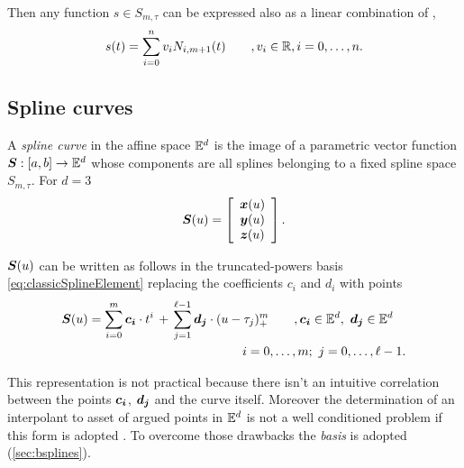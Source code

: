 \documentclass[dissertation.tex]{subfiles}
\begin{document}
Then any function $s\in S_{m,\tau}$ can be expressed also as a linear
combination of \bss,
\begin{equation}\label{eq:bsplineElement}
  s(t)=\sum_{i=0}^nv_i N_{i,m+1}(t)\qquad, v_i\in\mathbb{R}, i=0,\dots,n.
\end{equation}

\subsection{Spline curves}
A \emph{spline curve} in the affine space $\mathbb{E}^d$ is the image of a
parametric vector function $\boldsymbol{S}:[a,b]\rightarrow\mathbb{E}^d$ whose
components are all splines belonging to a fixed spline space
$S_{m,\tau}$. For $d=3$
\begin{equation}\label{eq:bsplineCurveComp}
  \boldsymbol{S}(u) = \left[
    \begin{array}{c}
      \boldsymbol{x}(u)\\
      \boldsymbol{y}(u)\\
      \boldsymbol{z}(u)
    \end{array}
    \right].
\end{equation}

$\boldsymbol{S}(u)$ can be written as follows in the
truncated-powers basis
\cref{eq:classicSplineElement} replacing the coefficients $c_i$ and
$d_i$ with points
\begin{equation}\label{eq:classicSplineCurve}
  \begin{multlined}
  \ve{S}(u)=\sum_{i=0}^m \ve{c_i}\cdot t^i\, +\, \sum_{j=1}^{\ell-1}
  \ve{d_j}\cdot (u-\tau_j)_+^m\qquad,\ve{c_i}\in\mE^d,\
  \ve{d_j}\in\mE^d\\
  i=0,\dots,m;\ j=0,\dots,\ell-1.
  \end{multlined}
\end{equation}

This representation is not practical because
there isn't an intuitive correlation between the points
$\boldsymbol{c_i}$, $\boldsymbol{d_j}$ and the curve itself. Moreover the
determination of an interpolant to asset of argued points in $\mathbb{E}^d$
is not a well conditioned problem if this form is adopted
\cite{deboor}. To overcome those drawbacks the \emph{\bss
  basis} is adopted (\cref{sec:bsplines}).
\end{document}
